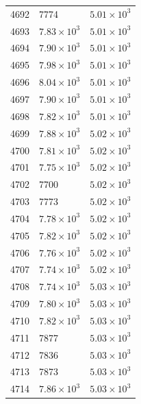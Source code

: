 \begin{table}[H]
\begin{tabular}{lll}
4692 & 7774 & $\displaystyle 5.01 \times 10^{3}$ \\
4693 & $\displaystyle 7.83 \times 10^{3}$ & $\displaystyle 5.01 \times 10^{3}$ \\
4694 & $\displaystyle 7.90 \times 10^{3}$ & $\displaystyle 5.01 \times 10^{3}$ \\
4695 & $\displaystyle 7.98 \times 10^{3}$ & $\displaystyle 5.01 \times 10^{3}$ \\
4696 & $\displaystyle 8.04 \times 10^{3}$ & $\displaystyle 5.01 \times 10^{3}$ \\
4697 & $\displaystyle 7.90 \times 10^{3}$ & $\displaystyle 5.01 \times 10^{3}$ \\
4698 & $\displaystyle 7.82 \times 10^{3}$ & $\displaystyle 5.01 \times 10^{3}$ \\
4699 & $\displaystyle 7.88 \times 10^{3}$ & $\displaystyle 5.02 \times 10^{3}$ \\
4700 & $\displaystyle 7.81 \times 10^{3}$ & $\displaystyle 5.02 \times 10^{3}$ \\
4701 & $\displaystyle 7.75 \times 10^{3}$ & $\displaystyle 5.02 \times 10^{3}$ \\
4702 & 7700 & $\displaystyle 5.02 \times 10^{3}$ \\
4703 & 7773 & $\displaystyle 5.02 \times 10^{3}$ \\
4704 & $\displaystyle 7.78 \times 10^{3}$ & $\displaystyle 5.02 \times 10^{3}$ \\
4705 & $\displaystyle 7.82 \times 10^{3}$ & $\displaystyle 5.02 \times 10^{3}$ \\
4706 & $\displaystyle 7.76 \times 10^{3}$ & $\displaystyle 5.02 \times 10^{3}$ \\
4707 & $\displaystyle 7.74 \times 10^{3}$ & $\displaystyle 5.02 \times 10^{3}$ \\
4708 & $\displaystyle 7.74 \times 10^{3}$ & $\displaystyle 5.03 \times 10^{3}$ \\
4709 & $\displaystyle 7.80 \times 10^{3}$ & $\displaystyle 5.03 \times 10^{3}$ \\
4710 & $\displaystyle 7.82 \times 10^{3}$ & $\displaystyle 5.03 \times 10^{3}$ \\
4711 & 7877 & $\displaystyle 5.03 \times 10^{3}$ \\
4712 & 7836 & $\displaystyle 5.03 \times 10^{3}$ \\
4713 & 7873 & $\displaystyle 5.03 \times 10^{3}$ \\
4714 & $\displaystyle 7.86 \times 10^{3}$ & $\displaystyle 5.03 \times 10^{3}$ \\

\end{tabular}
\end{table}
